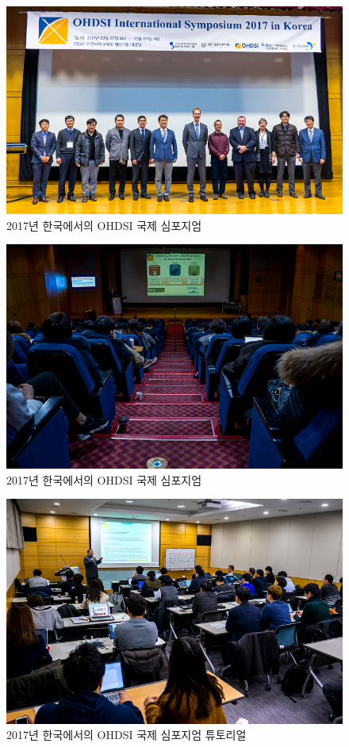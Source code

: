 \documentclass[11pt]{book}
\theoremstyle{definition}
\theoremstyle{definition}
\theoremstyle{definition}
\theoremstyle{remark}
\begin{document}
\begin{figure}
\includegraphics[width=0.8\linewidth]{images/OhdsiCommunity/DSC01956} \caption{2017년 한국에서의 OHDSI 국제 심포지엄}\label{fig:OHDSIInternationalSymposium2017inKorea1}
\end{figure}\begin{figure}
\includegraphics[width=0.8\linewidth]{images/OhdsiCommunity/DSC01861} \caption{2017년 한국에서의 OHDSI 국제 심포지엄}\label{fig:OHDSIInternationalSymposium2017inKorea1}
\end{figure}

\begin{figure}
\includegraphics[width=0.8\linewidth]{images/OhdsiCommunity/DSC02166} \caption{2017년 한국에서의 OHDSI 국제 심포지엄 튜토리얼}\label{fig:OHDSIInternationalSymposium2017inKorea2}
\end{figure}
\end{document}
